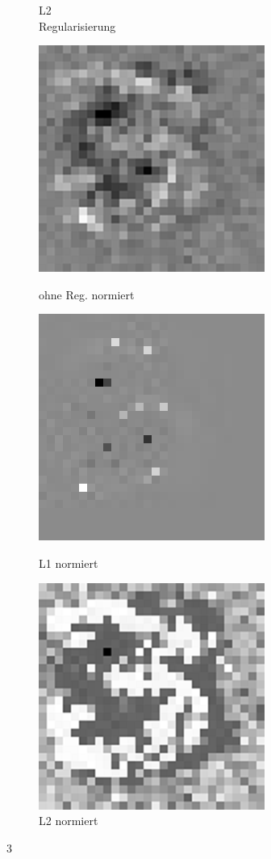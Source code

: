 \begin{figure}[ht]
\begin{minipage}[b]{.25\linewidth}
  		\caption{L2 \\ Regularisierung}
  	\end{minipage}
	\begin{minipage}[b]{.25\linewidth}
  		\includegraphics[scale=0.7]{bilder/l0_3_g}
  		\caption{ohne Reg. normiert}
  	\end{minipage}
  	\hspace{.05\linewidth}%
  	\begin{minipage}[b]{.25\linewidth}
  		\includegraphics[scale=0.7]{bilder/l1_3_g}
		\caption{L1 normiert}
	\end{minipage}
	\hspace{.05\linewidth}%
	\begin{minipage}[b]{.25\linewidth}
  		\includegraphics[scale=0.7]{bilder/l2_3_g}
  		\caption{L2 normiert}
  	\end{minipage}
\end{figure}
3